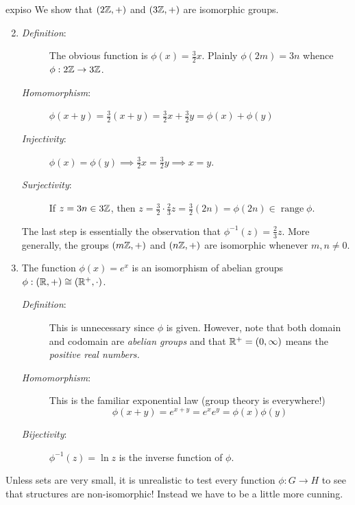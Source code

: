 \begin{examples}{}{expiso}
	\exstart We show that $(2\mathbb{Z},+)$ and $(3\mathbb{Z},+)$ are isomorphic groups.\vspace{-2pt}
	\begin{enumerate}\setcounter{enumi}{1}
	  \item[]\begin{description}
	  	\item[\normalfont\emph{Definition}:] The obvious function is $\phi(x)=\frac 32x$. Plainly $\phi(2m)=3n$ whence $\phi:2\mathbb{Z}\to 3\mathbb{Z}$.
	  	\item[\normalfont\emph{Homomorphism}:] $\phi(x+y)=\frac 32(x+y)=\frac 32x+\frac 32y=\phi(x)+\phi(y)$
	  	\item[\normalfont\emph{Injectivity}:] $\phi(x)=\phi(y)\implies \frac 32x=\frac 32y\implies x=y$.
	  	\item[\normalfont\emph{Surjectivity}:] If $z=3n\in 3\mathbb{Z}$, then $z=\frac 32\cdot\frac 23z=\frac 32(2n)=\phi(2n)\in\operatorname{range}\phi$.
		\end{description}
		The last step is essentially the observation that $\phi^{-1}(z)=\frac 23z$.\smallbreak
		More generally, the groups $(m\mathbb{Z},+)$ and $(n\mathbb{Z},+)$ are isomorphic whenever $m,n\neq 0$. 
	
		\item\label{ex:expiso1}	The function $\phi(x)=e^x$ is an isomorphism of abelian groups $\phi:(\mathbb{R},+)\cong(\mathbb{R}^+,\cdot)$.\vspace{-2pt}
		\begin{description}%
	  	\item[\normalfont\emph{Definition}:] This is unnecessary since $\phi$ is given. However, note that both domain and codomain are \emph{abelian groups} and that $\mathbb{R}^+=(0,\infty)$ means the \emph{positive real numbers.}
	  	\item[\normalfont\emph{Homomorphism}:] This is the familiar exponential law (group theory is everywhere!)
	  	\[
	  		\phi(x+y)=e^{x+y}=e^xe^y=\phi(x)\phi(y)
	  	\]
	  	\item[\normalfont\emph{Bijectivity}:] $\phi^{-1}(z)=\ln z$ is the inverse function of $\phi$.
		\end{description}
	\end{enumerate}
\end{examples}




Unless sets are very small, it is unrealistic to test every function $\phi:G\to H$ to see that structures are non-isomorphic! Instead we have to be a little more cunning.

